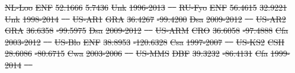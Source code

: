 \documentclass[hess, manuscript]{copernicus}
\providecommand{\DIFdeltex}[1]{{\protect\color{red}\sout{#1}}}                      %
\providecommand{\DIFdel}[1]{\texorpdfstring{\DIFdeltex{#1}}{}} %
\begin{document}
\DIFdel{NL-Loo }%
\DIFdel{ENF }%
\DIFdel{52.1666 }%
\DIFdel{5.7436 }%
\DIFdel{Unk }%
\DIFdel{1996-2013 }%
\DIFdel{\mbox{%
\cite{NL-Loo} }%
}%
\DIFdel{RU-Fyo }%
\DIFdel{ENF }%
\DIFdel{56.4615 }%
\DIFdel{32.9221 }%
\DIFdel{Unk }%
\DIFdel{1998-2014 }%
\DIFdel{\mbox{%
\cite{RU-Fyo} }%
}%
\DIFdel{US-AR1 }%
\DIFdel{GRA }%
\DIFdel{36.4267 }%
\DIFdel{-99.4200 }%
\DIFdel{Dsa }%
\DIFdel{2009-2012 }%
\DIFdel{\mbox{%
\cite{US-AR1} }%
}%
\DIFdel{US-AR2 }%
\DIFdel{GRA }%
\DIFdel{36.6358 }%
\DIFdel{-99.5975 }%
\DIFdel{Dsa }%
\DIFdel{2009-2012 }%
\DIFdel{\mbox{%
\cite{US-AR1} }%
}%
\DIFdel{US-ARM }%
\DIFdel{CRO }%
\DIFdel{36.6058 }%
\DIFdel{-97.4888 }%
\DIFdel{Cfa }%
\DIFdel{2003-2012 }%
\DIFdel{\mbox{%
\cite{US-ARM} }%
}%
\DIFdel{US-Blo }%
\DIFdel{ENF }%
\DIFdel{38.8953 }%
\DIFdel{-120.6328 }%
\DIFdel{Csa }%
\DIFdel{1997-2007 }%
\DIFdel{\mbox{%
\cite{US-Blo} }%
}%
\DIFdel{US-KS2 }%
\DIFdel{CSH }%
\DIFdel{28.6086 }%
\DIFdel{-80.6715 }%
\DIFdel{Cwa }%
\DIFdel{2003-2006 }%
\DIFdel{\mbox{%
\cite{US-KS2} }%
}%
\DIFdel{US-MMS }%
\DIFdel{DBF }%
\DIFdel{39.3232 }%
\DIFdel{-86.4131 }%
\DIFdel{Cfa }%
\DIFdel{1999-2014 }%
\DIFdel{\mbox{%
\cite{US-MMS} }%
}%
\end{document}
